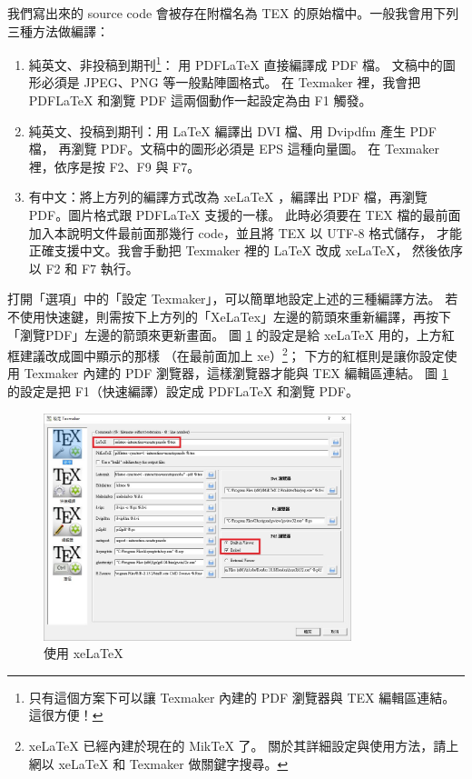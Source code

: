 \documentclass[12pt, a4paper]{article}
\begin{document}
我們寫出來的 source code 會被存在附檔名為 TEX 的原始檔中。一般我會用下列三種方法做編譯：
\begin{enumerate}
\item 純英文、非投稿到期刊\footnote{只有這個方案下可以讓 Texmaker 內建的 PDF 瀏覽器與 TEX 編輯區連結。
		這很方便！}：
		用 PDFLaTeX 直接編譯成 PDF 檔。
		文稿中的圖形必須是 JPEG、PNG 等一般點陣圖格式。
		在 Texmaker 裡，我會把 PDFLaTeX 和瀏覽 PDF 這兩個動作一起設定為由 F1 觸發。
\item 純英文、投稿到期刊：用 LaTeX 編譯出 DVI 檔、用 Dvipdfm 產生 PDF 檔，
		再瀏覽 PDF。文稿中的圖形必須是 EPS 這種向量圖。
		在 Texmaker 裡，依序是按 F2、F9 與 F7。
\item 有中文：將上方列的編譯方式改為 xeLaTeX ，編譯出 PDF 檔，再瀏覽 PDF。圖片格式跟 PDFLaTeX 支援的一樣。
		此時必須要在 TEX 檔的最前面加入本說明文件最前面那幾行 code，並且將 TEX 以 UTF-8 格式儲存，
		才能正確支援中文。我會手動把 Texmaker 裡的 LaTeX 改成 xeLaTeX，
		然後依序以 F2 和 F7 執行。
\end{enumerate}

打開「選項」中的「設定 Texmaker」，可以簡單地設定上述的三種編譯方法。
若不使用快速鍵，則需按下上方列的「XeLaTex」左邊的箭頭來重新編譯，再按下「瀏覽PDF」左邊的箭頭來更新畫面。
圖 \ref{fig:compile1} 的設定是給 xeLaTeX 用的，上方紅框建議改成圖中顯示的那樣
（在最前面加上 xe）\footnote{xeLaTeX 已經內建於現在的 MikTeX 了。
關於其詳細設定與使用方法，請上網以 xeLaTeX 和 Texmaker 做關鍵字搜尋。}；
下方的紅框則是讓你設定使用 Texmaker 內建的 PDF 瀏覽器，這樣瀏覽器才能與 TEX 編輯區連結。
圖 \ref{fig:compile1} 的設定是把 F1（快速編譯）設定成 PDFLaTeX 和瀏覽 PDF。

		\begin{figure}
		\centering
		\includegraphics[width=0.8\textwidth]{figures/compile1}
		\caption{使用 xeLaTeX}
		\label{fig:compile1}
		\end{figure}
\end{document}

